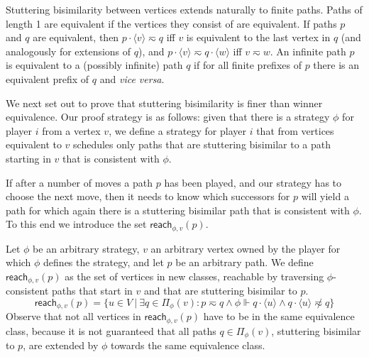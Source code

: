 \documentclass[a4paper]{llncs}
\newcommand{\player}{\ensuremath{\mathit{i}}\xspace}
\newcommand{\prefixes}[3][]{\ensuremath{\Pi_{#2}^{#1}(#3)}}
\newcommand{\consistency}{\ensuremath{\Vdash}}
\newcommand{\consistent}[2]{\ensuremath{{#2}\consistency{#1}}}
\newcommand{\path}[1]{\ensuremath{\langle #1 \rangle}}
\newcommand{\stut}{\eqsim}\newcommand{\semistut}{\sim_{\mathrm{semi-st}}}
\newcommand{\entry}[2]{\mathsf{reach}_{#1}(#2)}
\newcommand{\pathconcat}{\cdot}
\begin{document}
Stuttering bisimilarity between vertices extends naturally to finite
paths.  Paths of length 1 are equivalent if the vertices they consist of
are equivalent.  If paths $p$ and $q$ are equivalent, then $p \pathconcat
\path{v} \stut q$ iff $v$ is equivalent to the last vertex in $q$
(and analogously for extensions of $q$), and $p \pathconcat \path{v}
\stut q \pathconcat \path{w}$ iff $v \stut w$.  An infinite path $p$ is
equivalent to a (possibly infinite) path $q$ if for all finite prefixes
of $p$ there is an equivalent prefix of $q$ and \emph{vice versa}.

\medskip

We next set out to prove that stuttering bisimilarity is finer than
winner equivalence. Our proof strategy is as follows: given that there is
a strategy $\phi$ for player $\player$ from a vertex $v$, we define a 
strategy for player $\player$ that from vertices equivalent to $v$ schedules 
only paths that are stuttering bisimilar to a path starting in $v$ that is 
consistent with $\phi$.

If after a number of moves a path $p$ has been played, and our strategy
has to choose the next move, then it needs to know which successors for $p$ 
will yield a path for which again there is a stuttering bisimilar path that
is consistent with $\phi$. To this end we introduce the set $\entry{\phi,v}{p}$.

Let $\phi$ be an arbitrary strategy, $v$ an arbitrary vertex owned by the 
player for which $\phi$ defines the strategy, and let $p$ be an arbitrary 
path. We define $\entry{\phi,v}{p}$ as the set of vertices in new classes, 
reachable by traversing $\phi$-consistent paths that start in $v$ and that 
are stuttering bisimilar to $p$.
$$
\entry{\phi,v}{p} =
\{
  u \in V ~|~ \exists q \in \prefixes{\phi}{v}: p \stut q
  \land \consistent{q \pathconcat \path{u}}{\phi} \land q \pathconcat \path{u} \not\stut
  q
\}
$$
Observe that not all vertices in $\entry{\phi,v}{p}$ have to be in the same
equivalence class, because it is not guaranteed that all paths $q \in 
\prefixes{\phi}{v}$, stuttering bisimilar to $p$, are extended by $\phi$ 
towards the same equivalence class.
\end{document}
